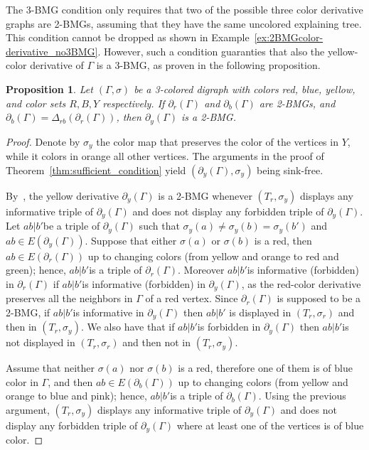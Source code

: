 \documentclass[final,3p,times]{elsarticle}
\newtheorem{proposition}[theorem]{Proposition}%
\begin{document}
The 3-BMG condition only requires that two of the possible three color derivative graphs are 2-BMGs, assuming that they have the same uncolored explaining tree. This condition cannot be dropped as shown in Example~\ref{ex:2BMGcolor-derivative_no3BMG}. However, such a condition guaranties that also the yellow-color derivative of $\Gamma$ is a 3-BMG, as proven in the following proposition. 

\begin{proposition}\label{prop:yellow-derv}
Let $(\Gamma,\sigma)$ be a 3-colored digraph with colors red, blue, yellow, and color sets $R,B,Y$ respectively. If $\partial_r(\Gamma)$ and $\partial_b(\Gamma)$ are 2-BMGs, and $\partial_b(\Gamma)=\Delta_{rb}(\partial_r(\Gamma))$, then $\partial_{y}(\Gamma)$ is a 2-BMG.
\end{proposition}
\begin{proof}
Denote by $\sigma_y$ the color map that preserves the color of the vertices in $Y$, while it colors in orange all other vertices.
The arguments in the proof of Theorem~\ref{thm:sufficient_condition} yield $(\partial_{y}(\Gamma),\sigma_y)$ being sink-free. 

By~\cite[Proposition~2.3]{korchmaros2021quasi}, the yellow derivative $\partial_{y}(\Gamma)$ is a 2-BMG whenever $(T_r,\sigma_y)$ displays any informative triple of $\partial_{y}(\Gamma)$ and does not display any forbidden triple of $\partial_{y}(\Gamma)$. Let $ab|b'$be a triple of $\partial_{y}(\Gamma)$ such that $\sigma_y(a)\ne \sigma_y(b)=\sigma_y(b')$ and $ab\in E(\partial_{y}(\Gamma))$. Suppose that either $\sigma(a)$ or $\sigma(b)$ is a red, then $ab\in E(\partial_{r}(\Gamma))$ up to changing colors (from yellow and orange to red and green); hence, $ab|b'$is a triple of $\partial_{r}(\Gamma)$. Moreover $ab|b'$is informative (forbidden) in $\partial_{r}(\Gamma)$ if $ab|b'$is informative (forbidden) in $\partial_{y}(\Gamma)$, as the red-color derivative preserves all the neighbors in $\Gamma$ of a red vertex. Since $\partial_{r}(\Gamma)$ is supposed to be a 2-BMG, if $ab|b'$is informative in $\partial_{y}(\Gamma)$ then $ab|b'$ is displayed in $(T_r,\sigma_r)$ and then in $(T_r,\sigma_y)$. We also have that if $ab|b'$is forbidden in $\partial_{y}(\Gamma)$ then $ab|b'$is not displayed in $(T_r,\sigma_r)$ and then not in $(T_r,\sigma_y)$.

Assume that neither $\sigma(a)$ nor $\sigma(b)$ is a red, therefore one of them is of blue color in $\Gamma$, and then $ab\in E(\partial_{b}(\Gamma))$ up to changing colors (from yellow and orange to blue and pink); hence, $ab|b'$is a triple of $\partial_{b}(\Gamma)$. Using the previous argument, $(T_r,\sigma_y)$ displays any informative triple of $\partial_{y}(\Gamma)$ and does not display any forbidden triple of $\partial_{y}(\Gamma)$ where at least one of the vertices is of blue color.
\end{proof}
\end{document}
